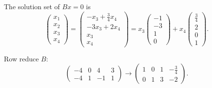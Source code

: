 \ans The solution set of $Bx = 0$ is
\[
\left(\begin{array}{r} x_1 \\ x_2 \\ x_3 \\ x_4 \end{array}\right)
= \left(\begin{array}{c} -x_3 + \frac{3}{4}x_4 \\ -3x_3 + 2x_4 \\
x_3 \\ x_4 \end{array}\right) = x_3\left(\begin{array}{r} -1 \\ -3 \\
1 \\ 0 \end{array}\right) + x_4\left(\begin{array}{r} \frac{3}{4} \\
2 \\ 0 \\ 1 \end{array}\right).
\]

\soln Row reduce $B$:
\[
\left(\begin{array}{rrrr} -4 & 0 & 4 & 3 \\ -4 & 1 & -1 & 1
\end{array}\right) \longrightarrow \left(\begin{array}{rrrr}
1 & 0 & 1 & -\frac{3}{4} \\ 0 & 1 & 3 & -2 \end{array}\right).
\]

